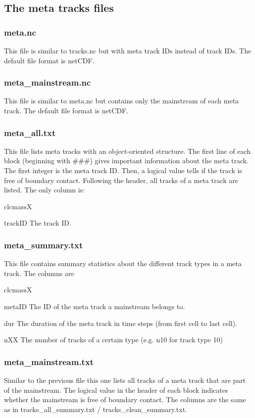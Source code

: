 \documentclass{scrartcl}
\begin{document}
\subsection{The meta tracks files}
\subsubsection{meta.nc}
This file is similar to tracks.nc but with meta track IDs instead of track IDs. The default file format is netCDF.

\subsubsection{meta\_mainstream.nc}
This file is similar to meta.nc but contains only the mainstream of each meta track. The default file format is netCDF.

\subsubsection{meta\_all.txt}
This file lists meta tracks with an object-oriented structure. The first line of each block (beginning with \#\#\#) gives important information about the meta track. The first integer is the meta track ID. Then, a logical value tells if the track is free of boundary contact. Following the header, all tracks of a meta track are listed. The only column is:
\begin{labeling}{clcmassX}
	\item[trackID] The track ID.
\end{labeling}

\subsubsection{meta\_summary.txt}
This file contains summary statistics about the different track types in a meta track. The columns are
\begin{labeling}{clcmassX}
	\item[metaID] The ID of the meta track a mainstream belongs to.
	\item[dur] The duration of the meta track in time steps (from first cell to last cell). 
	\item[nXX] The number of tracks of a certain type (e.g. n10 for track type 10)
\end{labeling}


\subsubsection{meta\_mainstream.txt}
Similar to the previous file this one lists all tracks of a meta track that are part of the mainstream. The logical value in the header of each block indicates whether the mainstream is free of boundary contact. The columns are the same as in tracks\_all\_summary.txt / tracks\_clean\_summary.txt.
\end{document}
